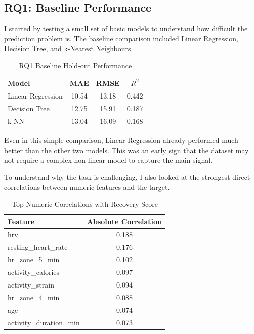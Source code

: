 \documentclass[conference]{IEEEtran}
\newcommand{\Rsq}{$R^{2}$}
\begin{document}
\subsection{RQ1: Baseline Performance}
I started by testing a small set of basic models to understand how difficult the prediction problem is. The baseline comparison included Linear Regression, Decision Tree, and k-Nearest Neighbours.

\begin{table}[htbp]
\caption{RQ1 Baseline Hold-out Performance}
\label{tab:rq1}
\centering
\begin{tabular}{lccc}
\toprule
\textbf{Model} & \textbf{MAE} & \textbf{RMSE} & \textbf{\Rsq} \\
\midrule
Linear Regression & 10.54 & 13.18 & 0.442 \\
Decision Tree     & 12.75 & 15.91 & 0.187 \\
k-NN              & 13.04 & 16.09 & 0.168 \\
\bottomrule
\end{tabular}
\end{table}

Even in this simple comparison, Linear Regression already performed much better than the other two models. This was an early sign that the dataset may not require a complex non-linear model to capture the main signal.

To understand why the task is challenging, I also looked at the strongest direct correlations between numeric features and the target.

\begin{table}[htbp]
\caption{Top Numeric Correlations with Recovery Score}
\label{tab:corr}
\centering
\begin{tabular}{lc}
\toprule
\textbf{Feature} & \textbf{Absolute Correlation} \\
\midrule
hrv                    & 0.188 \\
resting\_heart\_rate   & 0.176 \\
hr\_zone\_5\_min       & 0.102 \\
activity\_calories     & 0.097 \\
activity\_strain       & 0.094 \\
hr\_zone\_4\_min       & 0.088 \\
age                    & 0.074 \\
activity\_duration\_min & 0.073 \\
\bottomrule
\end{tabular}
\end{table}
\end{document}
